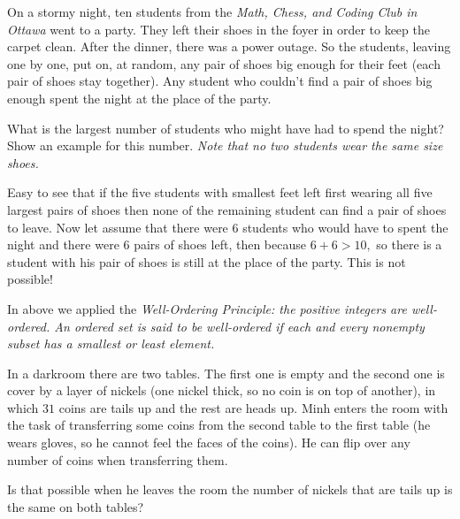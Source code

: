 \documentclass{article}
\begin{document}
\begin{example*}

    On a stormy night, ten students from the \textit{Math, Chess, and Coding Club in Ottawa} went to a party.
    They left their shoes in the foyer in order to keep the carpet clean. After the dinner, there was a power outage.
    So the students, leaving one by one, put on, at random, any pair of shoes big enough for their feet (each pair of shoes stay together).
    Any student who couldn't find a pair of shoes big enough spent the night at the place of the party.
	
    What is the largest number of students who might have had to spend the night? Show an example for this number.
    \textit{Note that no two students wear the same size shoes.}
\end{example*}

\begin{soln}
    Easy to see that if the five students with smallest feet left first wearing all five largest pairs of shoes
    then none of the remaining student can find a pair of shoes to leave.
	Now let assume that there were 6 students who would have to spent the night and there were 6 pairs of shoes left,
    then because $6 + 6 > 10,$ so there is a student with his pair of shoes is still at the place of the party. This is not possible!

    In above we applied the \textit{Well-Ordering Principle: the positive integers are well-ordered.
    An ordered set is said to be well-ordered if each and every nonempty subset has a smallest or least element.} 
\end{soln}

\begin{example*}

    In a darkroom there are two tables. The first one is empty and the second one is cover by a layer of nickels
    (one nickel thick, so no coin is on top of another), in which $31$ coins are tails up and the rest are heads up.
    Minh enters the room with the task of transferring some coins from the second table to the first table
    (he wears gloves, so he cannot feel the faces of the coins). He can flip over any number of coins when transferring them.

    Is that possible when he leaves the room the number of nickels that are tails up is the same on both tables?
\end{example*}
\end{document}
